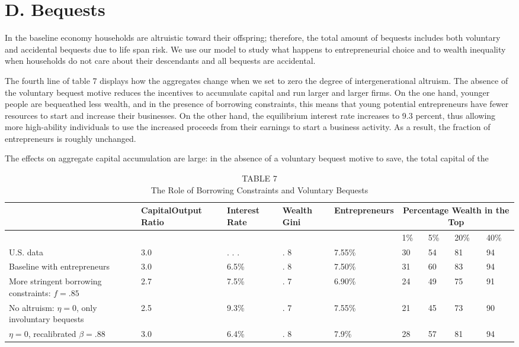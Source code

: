 \documentclass[10pt]{article}
\begin{document}
\section*{D. Bequests}
In the baseline economy households are altruistic toward their offspring; therefore, the total amount of bequests includes both voluntary and accidental bequests due to life span risk. We use our model to study what happens to entrepreneurial choice and to wealth inequality when households do not care about their descendants and all bequests are accidental.

The fourth line of table 7 displays how the aggregates change when we set to zero the degree of intergenerational altruism. The absence of the voluntary bequest motive reduces the incentives to accumulate capital and run larger and larger firms. On the one hand, younger people are bequeathed less wealth, and in the presence of borrowing constraints, this means that young potential entrepreneurs have fewer resources to start and increase their businesses. On the other hand, the equilibrium interest rate increases to 9.3 percent, thus allowing more high-ability individuals to use the increased proceeds from their earnings to start a business activity. As a result, the fraction of entrepreneurs is roughly unchanged.

The effects on aggregate capital accumulation are large: in the absence of a voluntary bequest motive to save, the total capital of the

\begin{table}[h]
\begin{center}
\captionsetup{labelformat=empty}
\caption{TABLE 7\\
The Role of Borrowing Constraints and Voluntary Bequests}
\begin{tabular}{|l|l|l|l|l|l|l|l|l|}
\hline
\multirow{2}{*}{} & \multirow[b]{2}{*}{CapitalOutput Ratio} & \multirow[b]{2}{*}{Interest Rate} & \multirow[b]{2}{*}{Wealth Gini} & \multirow[b]{2}{*}{Entrepreneurs} & \multicolumn{4}{|c|}{Percentage Wealth in the Top} \\
\hline
 &  &  &  &  & 1\% & 5\% & 20\% & 40\% \\
\hline
U.S. data & 3.0 & . . . & . 8 & 7.55\% & 30 & 54 & 81 & 94 \\
\hline
Baseline with entrepreneurs & 3.0 & 6.5\% & . 8 & 7.50\% & 31 & 60 & 83 & 94 \\
\hline
More stringent borrowing constraints: $f=.85$ & 2.7 & 7.5\% & . 7 & 6.90\% & 24 & 49 & 75 & 91 \\
\hline
No altruism: $\eta=0$, only involuntary bequests & 2.5 & 9.3\% & . 7 & 7.55\% & 21 & 45 & 73 & 90 \\
\hline
$\eta=0$, recalibrated $\beta=.88$ & 3.0 & 6.4\% & . 8 & 7.9\% & 28 & 57 & 81 & 94 \\
\hline
\end{tabular}
\end{center}
\end{table}
\end{document}
